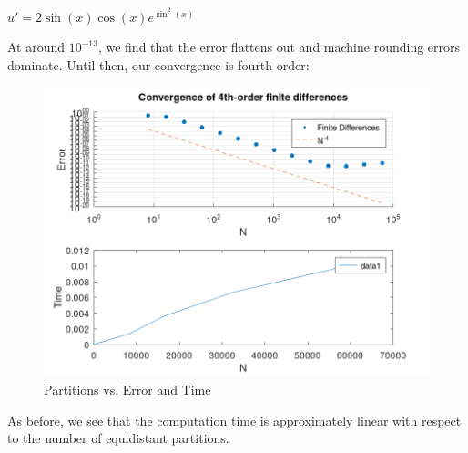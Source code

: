 $ u' = 2 \sin{(x)} \cos{(x)} e^{\sin^2{(x)}}$

\begin{solution}
  At around $10^{-13}$, we find that the error flattens out and machine rounding errors dominate. Until then, our convergence is fourth order:

  \begin{figure}[h]
    \centering
    \includegraphics[width=\textwidth]{problem_2a_fd.png}
    \caption{Partitions vs. Error and Time}
  \end{figure}

  As before, we see that the computation time is approximately linear with respect to the number of equidistant partitions.
  \ \\
\end{solution}